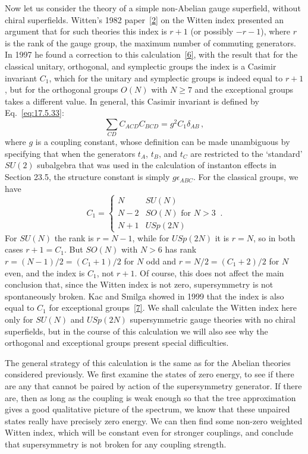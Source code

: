 Now let us consider the theory of a simple non-Abelian gauge superfield,
without chiral superfields. Witten's 1982
paper~\hyperref[ch29-ref-2]{[2]} on the Witten index presented an argument
that for such theories this index is \(r+1\) (or possibly \(-r-1\)), where
\(r\) is the rank of the gauge group, the maximum number of commuting
generators. In 1997 he found a correction to this
calculation~\hyperref[ch29-ref-6]{[6]}, with the result that for the
classical unitary, orthogonal, and symplectic groups the index is a Casimir
invariant \(C_1\), which for the unitary and symplectic groups is indeed
equal to \(r+1\), but for the orthogonal groups \(O(N)\) with \(N\geq7\) and
the exceptional groups takes a different value. In general, this Casimir
invariant is defined by Eq.~\eqref{eq:17.5.33}:
\begin{equation}
  \sum_{CD}C_{ACD}C_{BCD}=g^2C_1\delta_{AB}\,,
  \tag{29.4.4}\label{eq:29.4.4}
\end{equation}
where \(g\) is a coupling constant, whose definition can be made
unambiguous by specifying that when the generators \(t_A\), \(t_B\), and
\(t_C\) are restricted to the `standard' \(SU(2)\) subalgebra that was used
in the calculation of instanton effects in Section 23.5, the structure
constant is simply \(g\epsilon_{ABC}\). For the classical groups, we have
\begin{equation}
  C_1=
  \begin{cases}
    N   & SU(N)\\
    N-2 & SO(N)\text{ for }N>3\\
    N+1 & USp(2N)
  \end{cases}
  \,.
  \tag{29.4.5}\label{eq:29.4.5}
\end{equation}
For \(SU(N)\) the rank is \(r=N-1\), while for \(USp(2N)\) it is \(r=N\),
so in both cases \(r+1=C_1\). But \(SO(N)\) with \(N>6\) has rank
\(r=(N-1)/2=(C_1+1)/2\) for \(N\) odd and
\(r=N/2=(C_1+2)/2\) for \(N\) even, and the index is \(C_1\), not
\(r+1\). Of course, this does not affect the main conclusion that, since
the Witten index is not zero, supersymmetry is not spontaneously broken.
Kac and Smilga showed in 1999 that the index is also equal to \(C_1\) for
exceptional groups~\hyperref[ch29-ref-7]{[7]}. We shall calculate the
Witten index here only for \(SU(N)\) and \(USp(2N)\) supersymmetric gauge
theories with no chiral superfields, but in the course of this calculation
we will also see why the orthogonal and exceptional groups present special
difficulties.

The general strategy of this calculation is the same as for the Abelian
theories considered previously. We first examine the states of zero energy,
to see if there are any that cannot be paired by action of the supersymmetry
generator. If there are, then as long as the coupling is weak enough so that
the tree approximation gives a good qualitative picture of the spectrum,
we know that these unpaired states really have precisely zero energy. We can
then find some non-zero weighted Witten index, which will be constant even
for stronger couplings, and conclude that supersymmetry is not broken for
any coupling strength.

